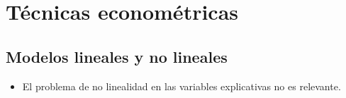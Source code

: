 \part{Técnicas econométricas}

\chapter{Modelos lineales y no lineales}

    \begin{itemize}
    
	\item El problema de no linealidad en las variables explicativas no es relevante.

    \end{itemize}
